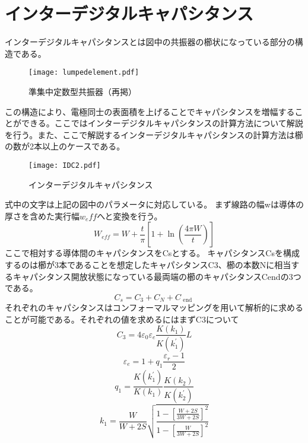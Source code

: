 \section{インターデジタルキャパシタンス}
インターデジタルキャパシタンスとは図中の共振器の櫛状になっている部分の構造である。
\begin{figure}[H]
    \label{le}
    \centering
    \texttt{[image: lumpedelement.pdf]}
    \caption{準集中定数型共振器（再掲）}
\end{figure}
この構造により、電極同士の表面積を上げることでキャパシタンスを増幅することができる。ここではインターデジタルキャパシタンスの計算方法について解説を行う。また、ここで解説するインターデジタルキャパシタンスの計算方法は櫛の数が2本以上のケースである。\cite*{Gevorgian1996,Dib2005,Dib2001ComprehensiveSO}
\begin{figure}[H]
    \centering
    \texttt{[image: IDC2.pdf]}
    \caption{インターデジタルキャパシタンス}
\end{figure}
式中の文字は上記の図中のパラメータに対応している。
まず線路の幅wは導体の厚さを含めた実行幅$w_eff$へと変換を行う。\cite*{Gevorgian1996}
\begin{equation}
    W_{e f f}=W+\frac{t}{\pi}\left[1+\ln \left(\frac{4 \pi W}{t}\right)\right]
\end{equation}
ここで相対する導体間のキャパシタンスをCsとする。
キャパシタンスCsを構成するのは櫛が3本であることを想定したキャパシタンスC3、櫛の本数Nに相当するキャパシタンス開放状態になっている最両端の櫛のキャパシタンスCendの3つである。
\begin{equation}
    C_{s}=C_{3}+C_{N}+C_{\text { end }}
\end{equation}
それぞれのキャパシタンスはコンフォーマルマッピングを用いて解析的に求めることが可能である。それぞれの値を求めるにはまずC3について
\begin{equation}
    C_{3}=4 \varepsilon_{0} \varepsilon_{e} \frac{K\left(k_{1}\right)}{K\left(k_{1}^{\prime}\right)} L
\end{equation}\begin{equation}
    \varepsilon_{e}=1+q_{1} \frac{\varepsilon_{r}-1}{2}
\end{equation}
\begin{equation}
        q_{1}=\frac{K\left(k_{1}^{\prime}\right)}{K\left(k_{1}\right)} \frac{K\left(k_{2}\right)}{K\left(k_{2}^{\prime}\right)}
\end{equation}
\begin{equation}
    k_{1}=\frac{W}{W+2 S} \sqrt{\frac{1-\left[\frac{W+2 S}{3 W+2 S}\right]^{2}}{1-\left[\frac{W}{3 W+2 S}\right]^{2}}}
\end{equation}
